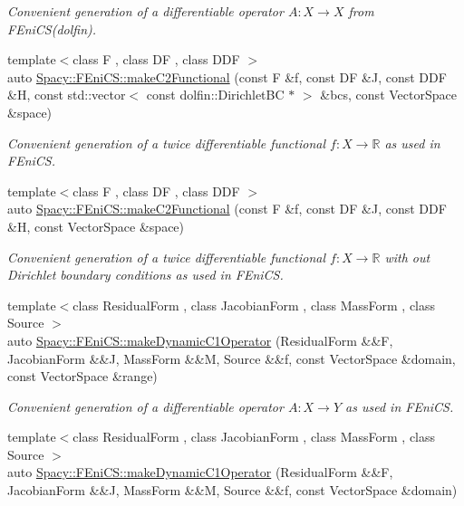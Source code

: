 \begin{DoxyCompactItemize}
\begin{DoxyCompactList}\small\item\em Convenient generation of a differentiable operator $A: X\rightarrow X$ from F\+Eni\+C\+S(dolfin). \end{DoxyCompactList}\item 
{\footnotesize template$<$class F , class D\+F , class D\+D\+F $>$ }\\auto \hyperlink{group__FenicsGroup_ga78db716003d17d5f781dfcb13a183519_ga78db716003d17d5f781dfcb13a183519}{Spacy\+::\+F\+Eni\+C\+S\+::make\+C2\+Functional} (const F \&f, const D\+F \&J, const D\+D\+F \&H, const std\+::vector$<$ const dolfin\+::\+Dirichlet\+B\+C $\ast$ $>$ \&bcs, const Vector\+Space \&space)
\begin{DoxyCompactList}\small\item\em Convenient generation of a twice differentiable functional $f: X\rightarrow \mathbb{R}$ as used in F\+Eni\+C\+S. \end{DoxyCompactList}\item 
{\footnotesize template$<$class F , class D\+F , class D\+D\+F $>$ }\\auto \hyperlink{group__FenicsGroup_ga4e69e5b7265feac21653bfc2da725a75_ga4e69e5b7265feac21653bfc2da725a75}{Spacy\+::\+F\+Eni\+C\+S\+::make\+C2\+Functional} (const F \&f, const D\+F \&J, const D\+D\+F \&H, const Vector\+Space \&space)
\begin{DoxyCompactList}\small\item\em Convenient generation of a twice differentiable functional $f: X\rightarrow \mathbb{R}$ with out Dirichlet boundary conditions as used in F\+Eni\+C\+S. \end{DoxyCompactList}\item 
{\footnotesize template$<$class Residual\+Form , class Jacobian\+Form , class Mass\+Form , class Source $>$ }\\auto \hyperlink{group__FenicsGroup_ga70d8ba7fecc2caba97343f5506340602_ga70d8ba7fecc2caba97343f5506340602}{Spacy\+::\+F\+Eni\+C\+S\+::make\+Dynamic\+C1\+Operator} (Residual\+Form \&\&F, Jacobian\+Form \&\&J, Mass\+Form \&\&M, Source \&\&f, const Vector\+Space \&domain, const Vector\+Space \&range)
\begin{DoxyCompactList}\small\item\em Convenient generation of a differentiable operator $A: X\rightarrow Y$ as used in F\+Eni\+C\+S. \end{DoxyCompactList}\item 
{\footnotesize template$<$class Residual\+Form , class Jacobian\+Form , class Mass\+Form , class Source $>$ }\\auto \hyperlink{group__FenicsGroup_ga467a0e85b66c8f17cdaf2884d5d443cd_ga467a0e85b66c8f17cdaf2884d5d443cd}{Spacy\+::\+F\+Eni\+C\+S\+::make\+Dynamic\+C1\+Operator} (Residual\+Form \&\&F, Jacobian\+Form \&\&J, Mass\+Form \&\&M, Source \&\&f, const Vector\+Space \&domain)

\end{DoxyCompactItemize}
